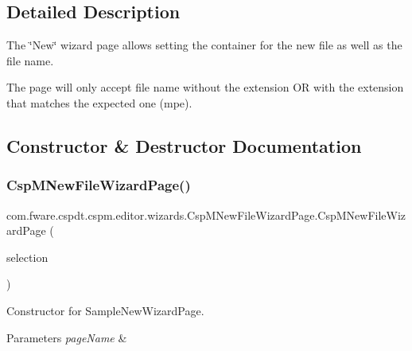 \subsection{Detailed Description}
The \char`\"{}\+New\char`\"{} wizard page allows setting the container for the new file as well as the file name. 

The page will only accept file name without the extension OR with the extension that matches the expected one (mpe). 

\subsection{Constructor \& Destructor Documentation}
\mbox{\label{classcom_1_1fware_1_1cspdt_1_1cspm_1_1editor_1_1wizards_1_1_csp_m_new_file_wizard_page_a66def179890d0335a2d5d32b31610671}} 
\subsubsection{\texorpdfstring{Csp\+M\+New\+File\+Wizard\+Page()}{CspMNewFileWizardPage()}}
{\footnotesize\ttfamily com.\+fware.\+cspdt.\+cspm.\+editor.\+wizards.\+Csp\+M\+New\+File\+Wizard\+Page.\+Csp\+M\+New\+File\+Wizard\+Page (\begin{DoxyParamCaption}\item[{I\+Selection}]{selection }\end{DoxyParamCaption})\hspace{0.3cm}{\ttfamily [inline]}}



Constructor for Sample\+New\+Wizard\+Page. 


\begin{DoxyParams}{Parameters}
{\em page\+Name} & \\
\hline
\end{DoxyParams}


